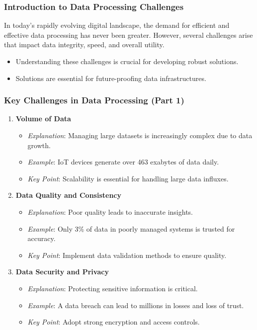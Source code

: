 \documentclass[aspectratio=169]{beamer}
\begin{document}
\begin{frame}[fragile]
    \frametitle{Introduction to Data Processing Challenges}
    In today's rapidly evolving digital landscape, the demand for efficient and effective data processing has never been greater. However, several challenges arise that impact data integrity, speed, and overall utility. 
    \begin{itemize}
        \item Understanding these challenges is crucial for developing robust solutions.
        \item Solutions are essential for future-proofing data infrastructures.
    \end{itemize}
\end{frame}

\begin{frame}[fragile]
    \frametitle{Key Challenges in Data Processing (Part 1)}
    \begin{enumerate}
        \item \textbf{Volume of Data}  
        \begin{itemize}
            \item \textit{Explanation}: Managing large datasets is increasingly complex due to data growth.
            \item \textit{Example}: IoT devices generate over 463 exabytes of data daily.
            \item \textit{Key Point}: Scalability is essential for handling large data influxes.
        \end{itemize}
        
        \item \textbf{Data Quality and Consistency}
        \begin{itemize}
            \item \textit{Explanation}: Poor quality leads to inaccurate insights.
            \item \textit{Example}: Only 3\% of data in poorly managed systems is trusted for accuracy.
            \item \textit{Key Point}: Implement data validation methods to ensure quality.
        \end{itemize}

        \item \textbf{Data Security and Privacy}
        \begin{itemize}
            \item \textit{Explanation}: Protecting sensitive information is critical.
            \item \textit{Example}: A data breach can lead to millions in losses and loss of trust.
            \item \textit{Key Point}: Adopt strong encryption and access controls.
        \end{itemize}
    \end{enumerate}
\end{frame}
\end{document}
